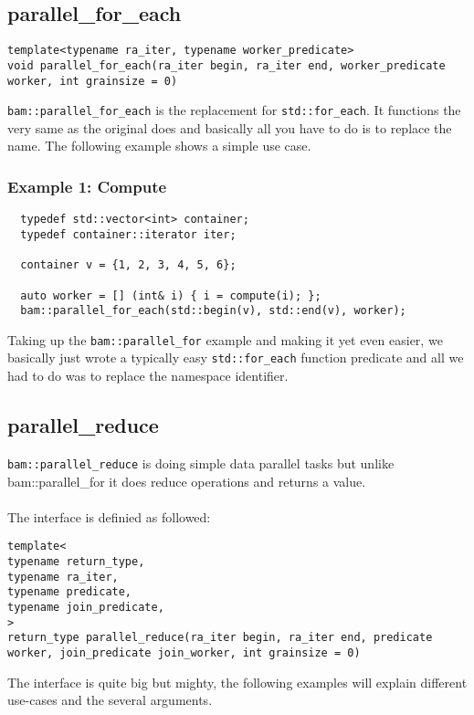 \documentclass[11pt, a4paper]{article}
\begin{document}
\subsection{parallel\_for\_each}
\begin{lstlisting}
template<typename ra_iter, typename worker_predicate>
void parallel_for_each(ra_iter begin, ra_iter end, worker_predicate worker, int grainsize = 0)
\end{lstlisting}

\texttt{bam::parallel\_for\_each} is the replacement for \texttt{std::for\_each}. It functions the very same as the original does and basically all you have to do is to replace the name. The following example shows a simple use case.

\subsubsection{Example 1: Compute}
\begin{lstlisting}
  typedef std::vector<int> container;
  typedef container::iterator iter;

  container v = {1, 2, 3, 4, 5, 6};

  auto worker = [] (int& i) { i = compute(i); };
  bam::parallel_for_each(std::begin(v), std::end(v), worker);
\end{lstlisting}

Taking up the \texttt{bam::parallel\_for} example and making it yet even easier, we basically just wrote a typically easy \texttt{std::for\_each} function predicate and all we had to do was to replace the namespace identifier. 

\subsection{parallel\_reduce}
\texttt{bam::parallel\_reduce} is doing simple data parallel tasks but unlike bam::parallel\_for it does reduce operations and returns a value.
\\\\The interface is definied as followed:
\begin{lstlisting}
template<
typename return_type, 
typename ra_iter, 
typename predicate, 
typename join_predicate, 
>
return_type parallel_reduce(ra_iter begin, ra_iter end, predicate worker, join_predicate join_worker, int grainsize = 0)

\end{lstlisting}

The interface is quite big but mighty, the following examples will explain different use-cases and the several arguments.
\end{document}
